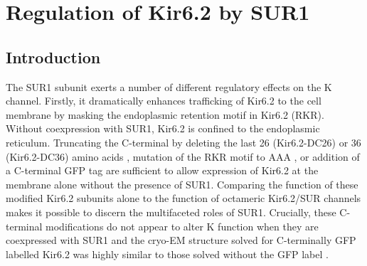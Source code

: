 \chapter{\label{ch:6}Regulation of Kir6.2 by SUR1} 

\graphicspath{{figures/ch6/}}

\minitoc

\section{Introduction}
The SUR1 subunit exerts a number of different regulatory effects on the K\ATP{} channel.
Firstly, it dramatically enhances trafficking of Kir6.2 to the cell membrane by masking the endoplasmic retention motif in Kir6.2 (RKR).
Without coexpression with SUR1, Kir6.2 is confined to the endoplasmic reticulum.
Truncating the C-terminal by deleting the last 26 (Kir6.2-\textgreek{D}C26) or 36 (Kir6.2-\textgreek{D}C36) amino acids \cite{tucker_truncation_1997}, mutation of the RKR motif to AAA \cite{zerangue_new_1999}, or addition of a C-terminal GFP tag \cite{john_sulphonylurea_1998} are sufficient to allow expression of Kir6.2 at the membrane alone without the presence of SUR1.
Comparing the function of these modified Kir6.2 subunits alone to the function of octameric Kir6.2/SUR channels makes it possible to discern the multifaceted roles of SUR1.
Crucially, these C-terminal modifications do not appear to alter K\ATP{} function when they are coexpressed with SUR1 \cite{tucker_truncation_1997, john_sulphonylurea_1998, ribalet_atp-sensitive_2006} and the cryo-EM structure solved for C-terminally GFP labelled Kir6.2 \cite{li_structure_2017} was highly similar to those solved without the GFP label \cite{martin_anti-diabetic_2017-1, lee_molecular_2017-1}.


